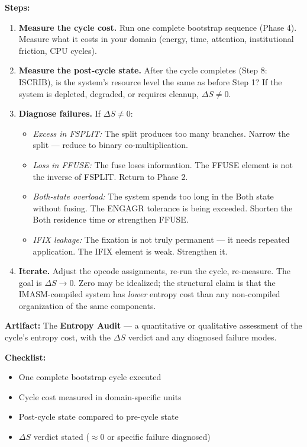 \documentclass[12pt,a4paper]{article}
\begin{document}
{\bf Steps:}

\begin{enumerate}[label=\textbf{6.\arabic*.}, leftmargin=2em]
\item \textbf{Measure the cycle cost.} Run one complete bootstrap sequence
    (Phase 4). Measure what it costs in your domain (energy, time, attention,
    institutional friction, CPU cycles).

\item \textbf{Measure the post-cycle state.} After the cycle completes (Step 8:
    ISCRIB), is the system's resource level the same as before Step 1? If the
    system is depleted, degraded, or requires cleanup, $\Delta S \neq 0$.

\item \textbf{Diagnose failures.} If $\Delta S \neq 0$:
    \begin{itemize}
    \item {\it Excess in FSPLIT:} The split produces too many branches. Narrow the
        split — reduce to binary co-multiplication.
    \item {\it Loss in FFUSE:} The fuse loses information. The FFUSE element is
        not the inverse of FSPLIT. Return to Phase 2.
    \item {\it Both-state overload:} The system spends too long in the Both state
        without fusing. The ENGAGR tolerance is being exceeded. Shorten the Both
        residence time or strengthen FFUSE.
    \item {\it IFIX leakage:} The fixation is not truly permanent — it needs
        repeated application. The IFIX element is weak. Strengthen it.
    \end{itemize}

\item \textbf{Iterate.} Adjust the opcode assignments, re-run the cycle, re-measure.
    The goal is $\Delta S \to 0$. Zero may be idealized; the structural claim is
    that the IMASM-compiled system has \emph{lower} entropy cost than any
    non-compiled organization of the same components.
\end{enumerate}

{\bf Artifact:} The \textbf{Entropy Audit} — a quantitative or qualitative
assessment of the cycle's entropy cost, with the $\Delta S$ verdict and any
diagnosed failure modes.

{\bf Checklist:}
\begin{itemize}
\item[ ] One complete bootstrap cycle executed
\item[ ] Cycle cost measured in domain-specific units
\item[ ] Post-cycle state compared to pre-cycle state
\item[ ] $\Delta S$ verdict stated ($\approx 0$ or specific failure diagnosed)
\end{itemize}
\end{document}
